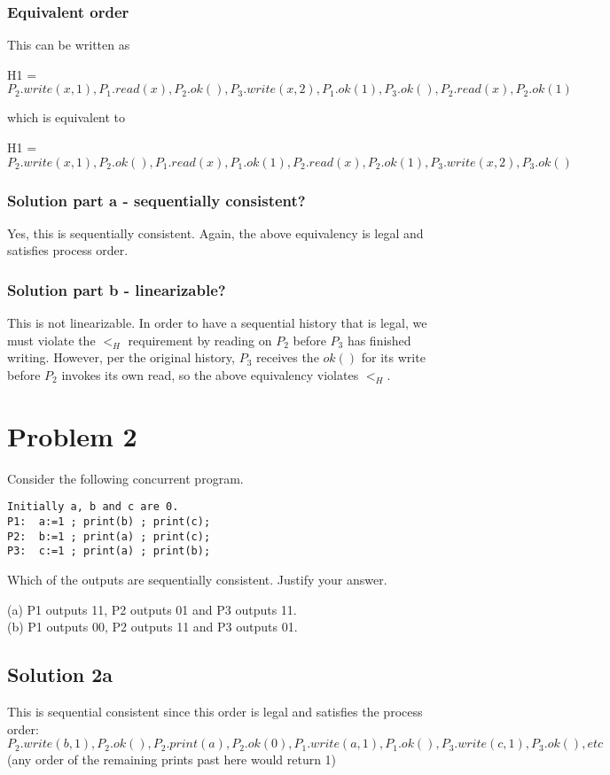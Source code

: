 \documentclass{article}
\begin{document}
\subsubsection{Equivalent order}
This can be written as

H1 = $P_2.write(x, 1), P_1.read(x), P_2.ok(), P_3.write(x, 2), P_1.ok(1), P_3.ok(), P_2.read(x), P_2.ok(1)$

which is equivalent to 

H1 = $P_2.write(x, 1), P_2.ok(), P_1.read(x), P_1.ok(1), P_2.read(x), P_2.ok(1), P_3.write(x, 2), P_3.ok()$

\subsubsection{Solution part a - sequentially consistent?}
Yes, this is sequentially consistent. Again, the above equivalency is legal and satisfies process order.
\subsubsection{Solution part b - linearizable?}
This is not linearizable. In order to have a sequential history that is legal, we must violate the $<_H$ requirement by reading on $P_2$ before $P_3$ has finished writing. However, per the original history, $P_3$ receives the $ok()$ for its write before $P_2$ invokes its own read, so the above equivalency violates $<_H$.

\pagebreak
\section{Problem 2}
Consider the following concurrent program.
\begin{verbatim}
Initially a, b and c are 0.
P1:  a:=1 ; print(b) ; print(c);
P2:  b:=1 ; print(a) ; print(c);
P3:  c:=1 ; print(a) ; print(b);
\end{verbatim}

Which of the outputs are sequentially consistent. Justify your answer.

(a) P1 outputs 11, P2 outputs 01 and P3 outputs 11.\\
(b) P1 outputs 00, P2 outputs 11 and P3 outputs 01.


\subsection{Solution 2a}
This is sequential consistent since this order is legal and satisfies the process order: \\
$P_2.write(b, 1), P_2.ok(), P_2.print(a), P_2.ok(0), P_1.write(a,1), P_1.ok(), P_3.write(c,1), P_3.ok(),etc$ (any order of the remaining prints past here would return 1)
 
\end{document}
